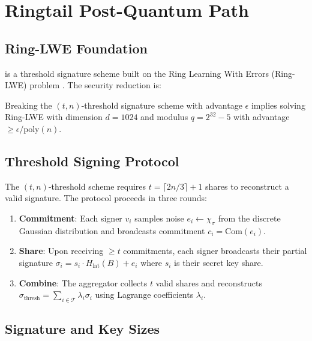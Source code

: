 \section{Ringtail Post-Quantum Path}


\subsection{Ring-LWE Foundation}

\Ringtail{} is a threshold signature scheme built on the Ring Learning With Errors (Ring-LWE) problem \cite{lyubashevsky2010ideal, lux-ringtail-pq}. The security reduction is:

\begin{theorem}
Breaking the \Ringtail{} $(t, n)$-threshold signature scheme with advantage $\epsilon$ implies solving Ring-LWE with dimension $d = 1024$ and modulus $q = 2^{32} - 5$ with advantage $\geq \epsilon / \text{poly}(n)$.
\end{theorem}

\subsection{Threshold Signing Protocol}

The $(t, n)$-threshold scheme requires $t = \lceil 2n/3 \rceil + 1$ shares to reconstruct a valid signature. The protocol proceeds in three rounds:

\begin{enumerate}
\item \textbf{Commitment}: Each signer $v_i$ samples noise $e_i \leftarrow \chi_\sigma$ from the discrete Gaussian distribution and broadcasts commitment $c_i = \text{Com}(e_i)$.
\item \textbf{Share}: Upon receiving $\geq t$ commitments, each signer broadcasts their partial signature $\sigma_i = s_i \cdot H_{\text{lat}}(B) + e_i$ where $s_i$ is their secret key share.
\item \textbf{Combine}: The aggregator collects $t$ valid shares and reconstructs $\sigma_{\text{thresh}} = \sum_{i \in \mathcal{T}} \lambda_i \sigma_i$ using Lagrange coefficients $\lambda_i$.
\end{enumerate}

\subsection{Signature and Key Sizes}

